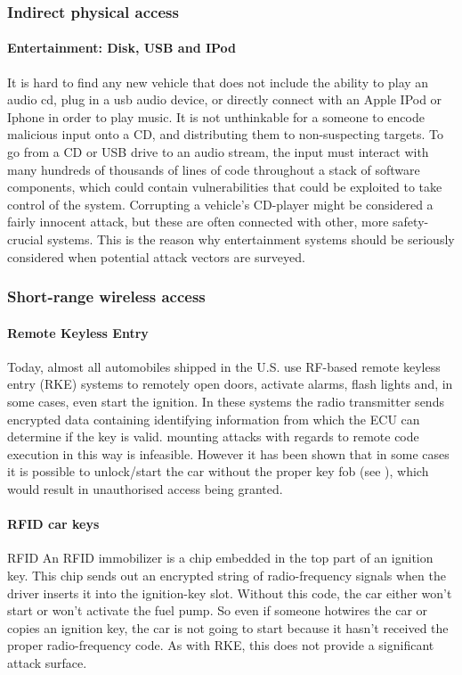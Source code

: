 \documentclass[11pt]{article}
\begin{document}
\subsubsection{Indirect physical access}

\paragraph{Entertainment: Disk, USB and IPod} It is hard to find any new vehicle that does not include the ability to play an audio cd, plug in a usb audio device, or directly connect with an Apple IPod or Iphone in order to play music. It is not unthinkable for a someone to encode malicious input onto a CD, and distributing them to non-suspecting targets. To go from a CD or USB drive to an audio stream, the input must interact with many hundreds of thousands of lines of code throughout a stack of software components, which could contain vulnerabilities that could be exploited to take control of the system\cite{Pike15}. Corrupting a vehicle's CD-player might be considered a fairly innocent attack, but these are often connected with other, more safety-crucial systems. This is the reason why entertainment systems should be seriously considered when potential attack vectors are surveyed.

\subsubsection{Short-range wireless access}

\paragraph{Remote Keyless Entry} Today, almost all automobiles shipped in the U.S. use RF-based remote keyless entry (RKE) systems to remotely open doors, activate alarms, flash lights and, in some cases, even start the ignition\cite{Kosher}. In these systems the radio transmitter sends encrypted data containing identifying information from which the ECU can determine if the key is valid\cite{MillerA}. mounting attacks with regards to remote code execution in this way is infeasible. However it has been shown that in some cases it is possible to unlock/start the car without the proper key fob (see \cite{KeeLoq}), which would result in unauthorised access being granted.

\paragraph{RFID car keys} RFID An RFID immobilizer is a chip embedded in the top part of an ignition key. This chip sends out an encrypted string of radio-frequency signals when the driver inserts it into the ignition-key slot. Without this code, the car either won't start or won't activate the fuel pump. So even if someone hotwires the car or copies an ignition key, the car is not going to start because it hasn't received the proper radio-frequency code\cite{RFID}. As with RKE, this does not provide a significant attack surface.
\end{document}

